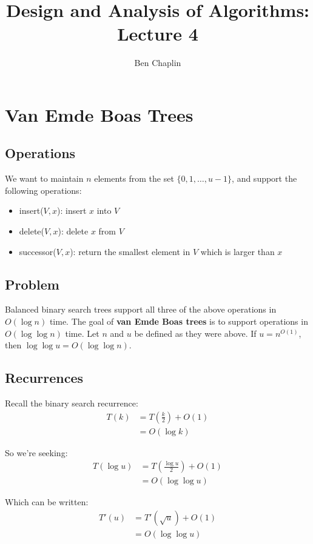 \documentclass[11pt]{article}
\title{Design and Analysis of Algorithms: Lecture 4}
\author{Ben Chaplin}
\date{}
\theoremstyle{plain}
\theoremstyle{definition}
\begin{document}
\maketitle
\tableofcontents

\section{Van Emde Boas Trees}
\subsection{Operations}

We want to maintain $n$ elements from the set $\{0, 1, \ldots, u - 1\}$, and support the following
operations:

\begin{itemize}
    \item insert($V, x$): insert $x$ into $V$
    \item delete($V, x$): delete $x$ from $V$
    \item successor($V, x$): return the smallest element in $V$ which is larger than $x$
\end{itemize}

\subsection{Problem}

Balanced binary search trees support all three of the above operations in $O(\log n)$ time. The 
goal of \textbf{van Emde Boas trees} is to support operations in $O(\log\log n)$ time.
\bigbreak
Let $n$ and $u$ be defined as they were above. If $u = n^{O(1)}$, then $\log\log u = O(\log\log n)$.

\subsection{Recurrences}

Recall the binary search recurrence:
\begin{align}
    T(k) &= T\left(\frac{k}{2}\right) + O(1)\\
         &= O(\log k)
\end{align}

So we're seeking:
\begin{align}
    T(\log u) &= T\left(\frac{\log u}{2}\right) + O(1)\\
              &= O(\log\log u)
\end{align}

Which can be written:
\begin{align}
    T'(u) &= T'(\sqrt u) + O(1)\\
          &= O(\log\log u)
\end{align}
\end{document}
